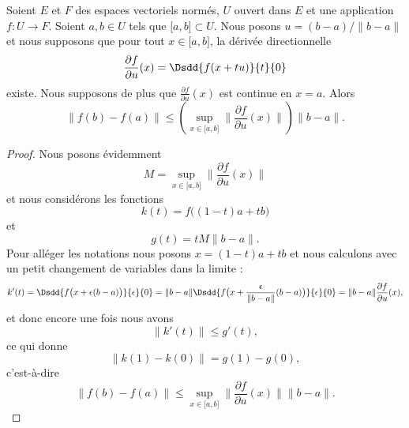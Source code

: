 \begin{proposition} \label{ProFSjmBAt}
    Soient \( E\) et \( F\) des espaces vectoriels normés, \( U \) ouvert dans \( E\) et une application \( f\colon U\to F\). Soient \( a,b\in U\) tels que \( \mathopen[ a , b \mathclose]\subset U\). Nous posons \( u=(b-a)/\| b-a \|\) et nous supposons que pour tout \( x\in\mathopen[ a , b \mathclose]\), la dérivée directionnelle
    \begin{equation}
        \frac{ \partial f }{ \partial u }(x)=\Dsdd{ f(x+tu) }{t}{0}
    \end{equation}
    existe. Nous supposons de plus que \( \frac{ \partial f }{ \partial u }(x)\) est continue en \( x=a\). Alors
    \begin{equation}
        \| f(b)-f(a) \|\leq\left( \sup_{x\in\mathopen[ a , b \mathclose]}\| \frac{ \partial f }{ \partial u }(x) \| \right)\| b-a \|.
    \end{equation}
\end{proposition}

\begin{proof}
    Nous posons évidemment
    \begin{equation}
        M=\sup_{x\in\mathopen[ a , b \mathclose]}\| \frac{ \partial f }{ \partial u }(x) \|
    \end{equation}
    et nous considérons les fonctions
    \begin{equation}
        k(t)=f\big( (1-t)a+tb \big)
    \end{equation}
    et
    \begin{equation}
        g(t)=tM\| b-a \|.
    \end{equation}
    Pour alléger les notations nous posons \( x=(1-t)a+tb\) et nous calculons avec un petit changement de variables dans la limite :
    \begin{equation}
        k'(t)=\Dsdd{  f\big( x+\epsilon(b-a) \big)  }{\epsilon}{0}=\| b-a \|\Dsdd{ f\big( x+\frac{ \epsilon }{ \| b-a \| }(b-a) \big) }{\epsilon}{0}=\| b-a \|\frac{ \partial f }{ \partial u }(x),
    \end{equation}
    et donc encore une fois nous avons
    \begin{equation}
        \| k'(t) \|\leq g'(t),
    \end{equation}
    ce qui donne
    \begin{equation}
        \| k(1)-k(0) \|=g(1)-g(0),
    \end{equation}
    c'est-à-dire
    \begin{equation}
        \| f(b)-f(a) \|\leq \sup_{x\in\mathopen[ a , b \mathclose]}\| \frac{ \partial f }{ \partial u }(x) \|\| b-a \|.
    \end{equation}
\end{proof}

